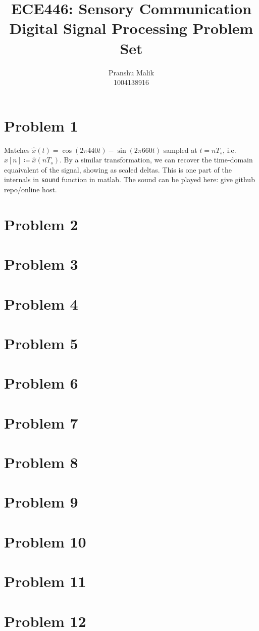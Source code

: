 \documentclass[10pt]{article}
\date{}
\begin{document}
\title{\textbf{\Large{\textsc{ECE446:} Sensory Communication}} \\ \Large{Digital Signal Processing Problem Set}\vspace{-0.3cm}}
\author{Pranshu Malik\\ \footnotesize{1004138916}\vspace{-3cm}}

\maketitle

\section{Problem 1}
Matches $\hat{x}(t) = \cos(2\pi440t) - \sin(2\pi660t)$ sampled at $t = nT_s$, i.e. $\hat{x}[n] \coloneqq \hat{x}(nT_s)$. By a similar transformation, we can recover the time-domain equaivalent of the signal, showing as scaled deltas. This is one part of the internals in \texttt{sound} function in matlab. The sound can be played here: give github repo/online host.

\section{Problem 2}
\section{Problem 3}
\section{Problem 4}
\section{Problem 5}
\section{Problem 6}
\section{Problem 7}
\section{Problem 8}
\section{Problem 9}
\section{Problem 10}
\section{Problem 11}
\section{Problem 12}
\end{document}
